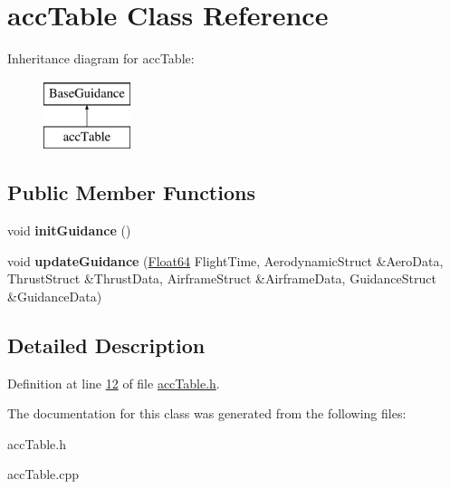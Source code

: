 \hypertarget{classacc_table}{}\section{acc\+Table Class Reference}
\label{classacc_table}
Inheritance diagram for acc\+Table\+:\begin{figure}[H]
\begin{center}
\leavevmode
\includegraphics[height=2.000000cm]{classacc_table}
\end{center}
\end{figure}
\subsection*{Public Member Functions}
\begin{DoxyCompactItemize}
\item 
\mbox{\label{classacc_table_acccff68d7c26403ed326b2c487fd80ed}} 
void {\bfseries init\+Guidance} ()
\item 
\mbox{\label{classacc_table_a60a9fdb7b041cd5aae020c4a5d252fba}} 
void {\bfseries update\+Guidance} (\hyperlink{group___tools_ga3f1431cb9f76da10f59246d1d743dc2c}{Float64} Flight\+Time, Aerodynamic\+Struct \&Aero\+Data, Thrust\+Struct \&Thrust\+Data, Airframe\+Struct \&Airframe\+Data, Guidance\+Struct \&Guidance\+Data)
\end{DoxyCompactItemize}


\subsection{Detailed Description}


Definition at line \hyperlink{acc_table_8h_source_l00012}{12} of file \hyperlink{acc_table_8h_source}{acc\+Table.\+h}.



The documentation for this class was generated from the following files\+:\begin{DoxyCompactItemize}
\item 
acc\+Table.\+h\item 
acc\+Table.\+cpp\end{DoxyCompactItemize}
